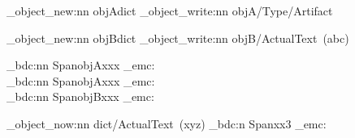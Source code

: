 \documentclass{article}
\begin{document}
\ExplSyntaxOn
\pdf_object_new:nn   {objA}{dict}
\pdf_object_write:nn {objA}{/Type/Artifact}

\pdf_object_new:nn   {objB}{dict}
\pdf_object_write:nn {objB}{/ActualText~(abc)}

\vspace*{44\baselineskip}
\pdf_bdc:nn {Span}{objA}xxx
\pdf_emc:
\\
\pdf_bdc:nn {Span}{objA}xxx
\pdf_emc:
\\
\pdf_bdc:nn {Span}{objB}xxx
\pdf_emc:

\pdf_object_now:nn {dict}{/ActualText~(xyz)}
\pdf_bdc:n {Span}xx3
\pdf_emc:

\ExplSyntaxOff
\end{document}
